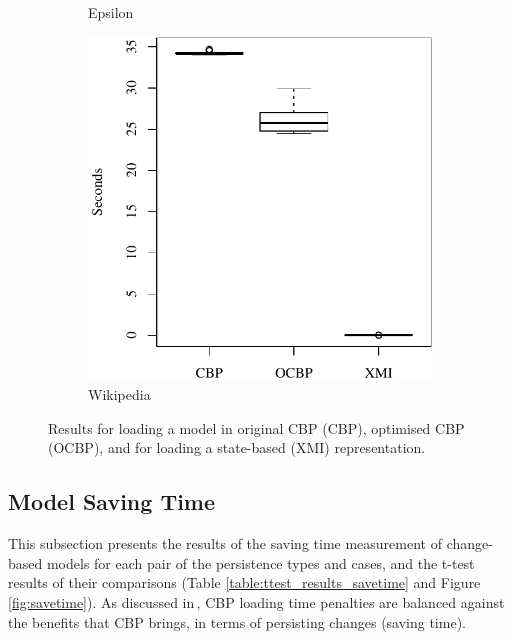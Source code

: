 \documentclass{llncs}
\begin{document}
\begin{figure}[ht]
\begin{subfigure}{0.325\textwidth}
        \caption{Epsilon}
        \label{fig:load_time_epsilon}
    \end{subfigure}
    \hfill
    \begin{subfigure}{0.325\textwidth}
        \centering
        \includegraphics[width=\linewidth]{images/load_time_wikipedia}
        \caption{Wikipedia}
        \label{fig:load_time_wikipedia}
    \end{subfigure}
    \caption{Results for loading a model in original CBP (CBP), optimised CBP (OCBP), and for loading a state-based (XMI) representation.}
    \label{fig:loadtime}
\end{figure}

 \vspace{-25pt}
\subsection{Model Saving Time}
\label{subsec:saving_time_test}
 
  \vspace{-10pt}
 This subsection presents the results of the saving time measurement of change-based models for each pair of the persistence types and cases, and the t-test results of their comparisons (Table \ref{table:ttest_results_savetime} and Figure \ref{fig:savetime}). As discussed in\,\cite{yohannis2017turning}, CBP loading time penalties are balanced against the benefits that CBP brings, in terms of  persisting changes (saving time).
 
\end{document}
